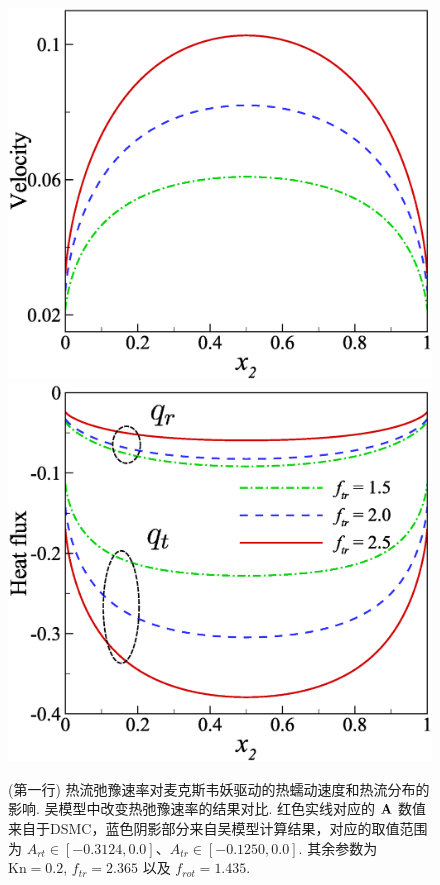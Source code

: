 \begin{figure}[t]
	\includegraphics[scale=0.30,clip=true]{Fig/Creep_u_vf} \quad
	\includegraphics[scale=0.30,clip=true]{Fig/Creep_Q_vf}
	\caption{
		(第一行) 热流弛豫速率对麦克斯韦妖驱动的热蠕动速度和热流分布的影响. 吴模型中改变热弛豫速率的结果对比. 红色实线对应的 ${\bf{A}}$ 数值来自于DSMC，蓝色阴影部分来自吴模型计算结果，对应的取值范围为 ${A_{rt}}\in[-0.3124,0.0]$、${A_{tr}}\in[-0.1250,0.0]$. 其余参数为 $\text{Kn}=0.2$, $f_{tr}=2.365$ 以及 $f_{rot}=1.435$. 
}
\end{figure}
